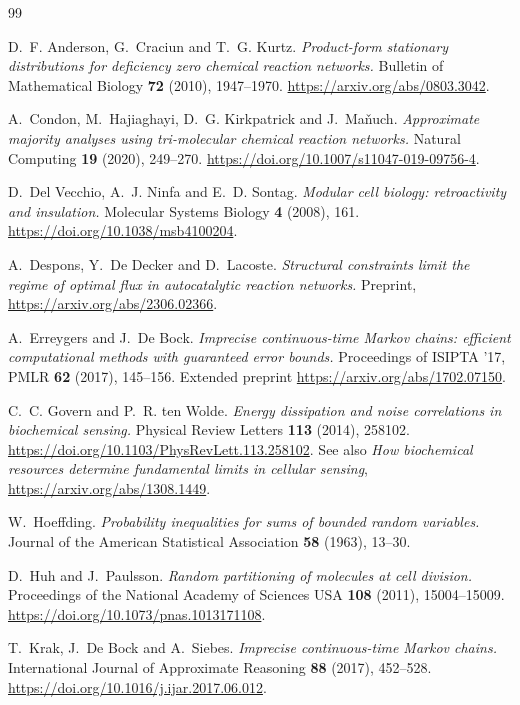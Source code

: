 \documentclass[11pt]{article}
\theoremstyle{plain}
\theoremstyle{definition}
\theoremstyle{remark}
\begin{document}
\begin{thebibliography}{99}

D.~F. Anderson, G.~Craciun and T.~G. Kurtz.
\emph{Product-form stationary distributions for deficiency zero chemical
reaction networks.}
Bulletin of Mathematical Biology \textbf{72} (2010), 1947--1970.
\url{https://arxiv.org/abs/0803.3042}.

A.~Condon, M.~Hajiaghayi, D.~G. Kirkpatrick and J.~Ma\v{n}uch.
\emph{Approximate majority analyses using tri-molecular chemical reaction
networks.}
Natural Computing \textbf{19} (2020), 249--270.
\url{https://doi.org/10.1007/s11047-019-09756-4}.

D.~Del Vecchio, A.~J. Ninfa and E.~D. Sontag.
\emph{Modular cell biology: retroactivity and insulation.}
Molecular Systems Biology \textbf{4} (2008), 161.
\url{https://doi.org/10.1038/msb4100204}.

A.~Despons, Y.~De Decker and D.~Lacoste.
\emph{Structural constraints limit the regime of optimal flux in
autocatalytic reaction networks.}
Preprint, \url{https://arxiv.org/abs/2306.02366}.

A.~Erreygers and J.~De Bock.
\emph{Imprecise continuous-time Markov chains: efficient computational methods
with guaranteed error bounds.}
Proceedings of ISIPTA '17, PMLR \textbf{62} (2017), 145--156.
Extended preprint \url{https://arxiv.org/abs/1702.07150}.

C.~C. Govern and P.~R. ten Wolde.
\emph{Energy dissipation and noise correlations in biochemical sensing.}
Physical Review Letters \textbf{113} (2014), 258102.
\url{https://doi.org/10.1103/PhysRevLett.113.258102}.
See also \emph{How biochemical resources determine fundamental limits in
cellular sensing}, \url{https://arxiv.org/abs/1308.1449}.

W.~Hoeffding.
\emph{Probability inequalities for sums of bounded random variables.}
Journal of the American Statistical Association \textbf{58} (1963), 13--30.

D.~Huh and J.~Paulsson.
\emph{Random partitioning of molecules at cell division.}
Proceedings of the National Academy of Sciences USA \textbf{108} (2011),
15004--15009.
\url{https://doi.org/10.1073/pnas.1013171108}.

T.~Krak, J.~De Bock and A.~Siebes.
\emph{Imprecise continuous-time Markov chains.}
International Journal of Approximate Reasoning \textbf{88} (2017), 452--528.
\url{https://doi.org/10.1016/j.ijar.2017.06.012}.


\end{thebibliography}
\end{document}
